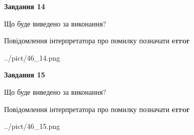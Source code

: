 \documentclass[11pt, ukrainian]{article}
\begin{document}
{\begin {large}
{\begin {center}\textbf{Завдання 14}\end {center}}\par
Що буде виведено за виконання? \par
Повідомлення інтерпретатора про помилку позначати \textbf{error}

\begin{center}
	{../pict/46_14.png}
\end{center}
\newpage

{\begin {center}\textbf{Завдання 15}\end {center}}\par
Що буде виведено за виконання? \par
Повідомлення інтерпретатора про помилку позначати \textbf{error}

\begin{center}
	{../pict/46_15.png}
\end{center}
\newpage

\end {large}}
\end{document}
